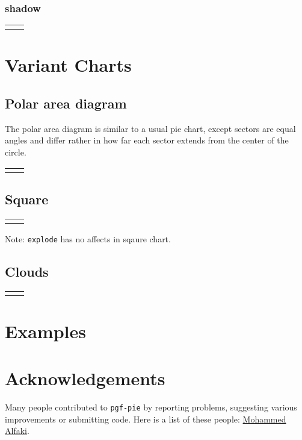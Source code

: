 \documentclass{article}
\newcommand{\demo}[2][1]{
  \begin{center}
  \begin{tabular}{cc}
    \begin{minipage}{.49\linewidth}
      \centering
      \resizebox{#1\linewidth}{!}{
        
      }
    \end{minipage}
    &
    \begin{minipage}{.45\linewidth}
      
    \end{minipage}
  \end{tabular}
  \end{center}
}
\newcommand{\example}[2][1]{
  \begin{center}  
    \resizebox{#1\linewidth}{!}{
      
    }
  \end{center}
  
}
\begin{document}
\subsubsection{shadow}
\demo[0.6]{shadow}

\section{Variant Charts}
\subsection{Polar area diagram}
The polar area diagram is similar to a usual pie chart, except sectors
are equal angles and differ rather in how far each sector extends from
the center of the circle.

\demo[0.6]{polar}

\subsection{Square}

\demo[0.6]{square}

Note: \texttt{explode} has no affects in sqaure chart.

\subsection{Clouds}

\demo[0.6]{cloud}

\section{Examples}


\section{Acknowledgements}
Many people contributed to \texttt{pgf-pie} by reporting problems,
suggesting various improvements or submitting code. Here is a list of
these people:
\href{mailto:mohammed.alfaki@ii.uib.no}{Mohammed Alfaki}.
                                              
\end{document}
